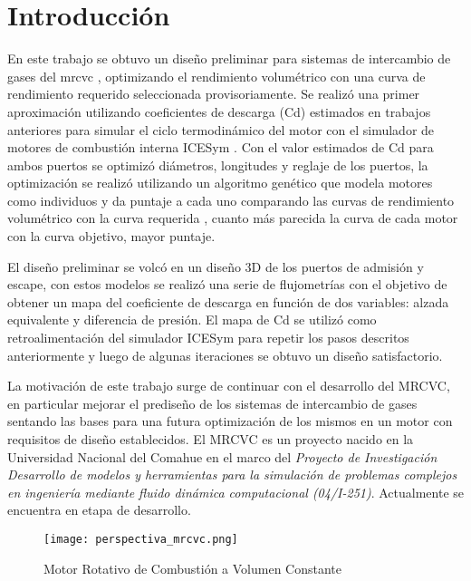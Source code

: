 \chapter{Introducción}

En este trabajo se obtuvo un diseño preliminar para sistemas de intercambio de
gases del \gls{mrcvc} \cite{toth}, optimizando el rendimiento volumétrico con
una curva de rendimiento requerido seleccionada provisoriamente.
%
Se realizó una primer aproximación utilizando coeficientes de descarga (Cd)
estimados en trabajos anteriores \cite{lopez13} para simular el ciclo
termodinámico del motor con el simulador de motores de combustión interna ICESym
\cite{icesym}.
%
Con el valor estimados de Cd para ambos puertos se optimizó diámetros,
longitudes y reglaje de los puertos, la optimización se realizó utilizando un
algoritmo genético que modela motores como individuos y da puntaje a cada uno
comparando las curvas de rendimiento volumétrico con la curva requerida ,
cuanto más parecida la curva de cada motor con la curva objetivo, mayor
puntaje.


El diseño preliminar se volcó en un diseño 3D de los puertos de admisión y
escape, con estos modelos se realizó una serie de flujometrías con el objetivo
de obtener un mapa del coeficiente de descarga en función de dos variables:
alzada equivalente y diferencia de presión.
%
El mapa de Cd se utilizó como retroalimentación del simulador ICESym para
repetir los pasos descritos anteriormente y luego de algunas iteraciones se
obtuvo un diseño satisfactorio.

La motivación de este trabajo surge de continuar con el desarrollo del MRCVC,
en particular mejorar el prediseño de los sistemas de intercambio de gases
sentando las bases para una futura optimización de los mismos en un motor con
requisitos de diseño establecidos.
%
El MRCVC es un proyecto nacido en la Universidad Nacional del Comahue en el
marco del \emph{Proyecto de Investigación Desarrollo de modelos y herramientas
para la simulación de problemas complejos en ingeniería mediante fluido dinámica
computacional (04/I-251)}. Actualmente se encuentra en etapa de desarrollo.

\begin{figure}[h!]
    \centering
    \texttt{[image: perspectiva\_mrcvc.png]}
    \caption{Motor Rotativo de Combustión a Volumen Constante}
    \label{fig:mrcvc}
\end{figure}
